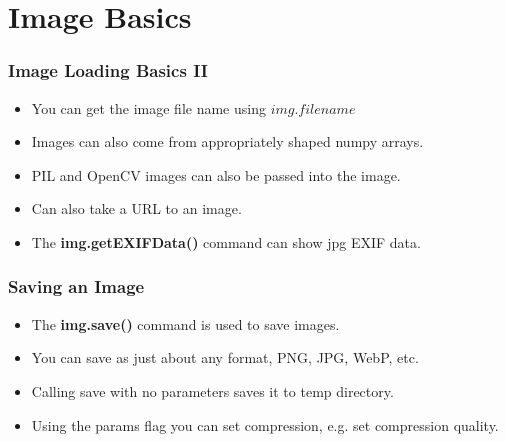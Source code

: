 \documentclass{beamer}
\begin{document}
 \section{Image Basics}
\begin{frame}
\frametitle{Image Loading Basics II}
\begin{itemize}
\item You can get the image file name using $img.filename$
\item Images can also come from appropriately shaped numpy arrays.
\item PIL and OpenCV images can also be passed into the image.
\item Can also take a URL to an image. 
\item The \textbf{img.getEXIFData()} command can show jpg EXIF data.
\end{itemize}
\end{frame}

\begin{frame}
\frametitle{Saving an Image}
\begin{itemize}
\item The \textbf{img.save()} command is used to save images.
\item You can save as just about any format, PNG, JPG, WebP, etc.
\item Calling save with no parameters saves it to temp directory.
\item Using the params flag you can set compression, e.g. set
  compression quality. 
\end{itemize}
\end{frame}
\end{document}
